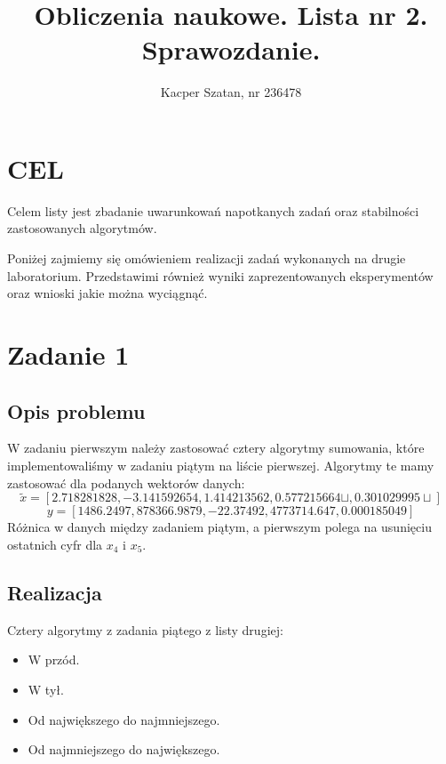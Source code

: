 \documentclass[]{article}
\title{Obliczenia naukowe. Lista nr 2. Sprawozdanie.}
\author{Kacper Szatan, nr 236478}
\begin{document}
\maketitle
\section*{\centering CEL}
Celem listy jest zbadanie uwarunkowań napotkanych zadań oraz stabilności zastosowanych algorytmów.

Poniżej zajmiemy się omówieniem realizacji zadań wykonanych na drugie laboratorium. Przedstawimi również wyniki zaprezentowanych eksperymentów oraz wnioski jakie można wyciągnąć.
\section{Zadanie 1}
\subsection{Opis problemu}
W zadaniu pierwszym należy zastosować cztery algorytmy sumowania, które implementowaliśmy w zadaniu piątym na liście pierwszej. Algorytmy te mamy zastosować dla podanych wektorów danych:
\[\tilde{x} = [2.718281828, -3.141592654, 1.414213562, 0.577215664\sqcup, 0.301029995\sqcup]\]
\[y = [1486.2497, 878366.9879, -22.37492, 4773714.647, 0.000185049]\]
Różnica w danych między zadaniem piątym, a pierwszym polega na usunięciu ostatnich cyfr dla $x_4$ i $x_5$. 
\subsection{Realizacja}
Cztery algorytmy z zadania piątego z listy drugiej:
\begin{itemize}
	\item W przód.
	\item W tył.
	\item Od największego do najmniejszego. 
	\item Od najmniejszego do największego.
\end{itemize}
\newpage
\end{document}
